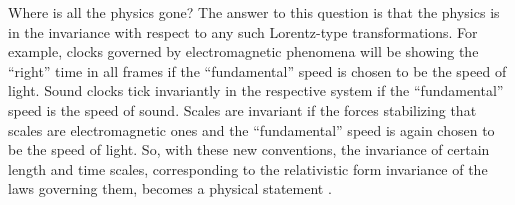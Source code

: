 \documentclass[pre,preprint,showpacs,showkeys,amsfonts]{revtex4}
\begin{document}
Where is all the physics gone? The answer to this question is that
the physics is in the invariance with respect to any such Lorentz-type transformations.
For example, clocks governed by electromagnetic phenomena will be showing the ``right''
time in all frames if the ``fundamental'' speed is chosen to be the speed of light.
Sound clocks tick invariantly in the respective system if
the ``fundamental'' speed is the speed of sound.
Scales are invariant if the forces stabilizing that scales are electromagnetic ones
and the  ``fundamental'' speed is again chosen to be the speed of light.
So, with these new conventions, the invariance of certain length \cite{peres-84}
and time scales, corresponding to the relativistic form invariance of the
laws governing them, becomes a physical statement
 \cite{bell-92,peres-84,svozil-relrel,svozil-2001-convention}.
\end{document}
